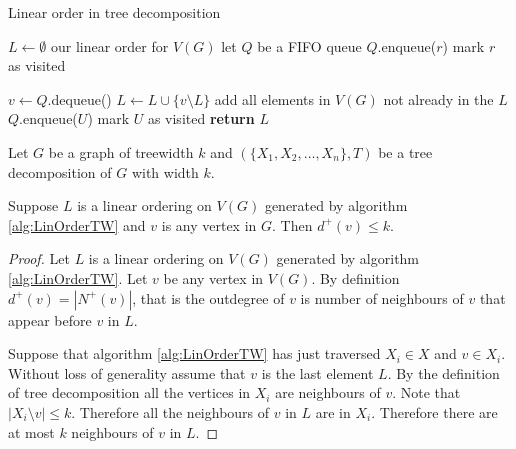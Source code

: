 
\begin{algorithm}[h]
    \caption{Linear order in tree decomposition}
    \label{alg:LinOrderTW}
    \begin{algorithmic}[1]
        
            \State $L \gets \emptyset$ \Comment our linear order for $V(G)$
            \State let $Q$ be a FIFO queue 
            \State $Q$.enqueue($r$)
            \State mark $r$ as visited
            
                \State $v \gets Q$.dequeue()
                \State $L \gets L \cup \{v\setminus L\}$ \Comment add all elements in $V(G)$ not already in the $L$
                    \State $Q$.enqueue($U$)
                    \State mark $U$ as visited
                \EndFor        
            \EndWhile 
            \State \textbf{return}  $L$
        \EndFunction
    \end{algorithmic}
\end{algorithm}

\begin{lemma} \label{Lemma_TWLinOrdBound}
    Let $G$ be a graph of treewidth $k$ and $(\{X_1,X_2,\dots,X_n\},T)$ be a tree decomposition of $G$ with width $k$.
    
    Suppose $L$ is a linear ordering on $V(G)$ generated by algorithm \ref{alg:LinOrderTW} and $v$ is any vertex in $G$. Then $d^+(v) \leq k$. 
\end{lemma}

\begin{proof}    
    Let $L$ is a linear ordering on $V(G)$ generated by algorithm \ref{alg:LinOrderTW}. Let $v$ be any vertex in $V(G)$. By definition $d^+(v) = |N^+(v)|$, that is the outdegree of $v$ is number of neighbours of $v$ that appear before $v$ in $L$. 
    
    Suppose that algorithm \ref{alg:LinOrderTW} has just traversed $X_i\in X$ and $v\in X_i$. Without loss of generality assume that $v$ is the last element $L$. By the definition of tree decomposition all the vertices in $X_i$ are neighbours of $v$. Note that $|X_i\setminus v|\leq k$. Therefore all the neighbours of $v$ in $L$ are in $X_i$. Therefore there are at most $k$ neighbours of $v$ in $L$.   
\end{proof}

